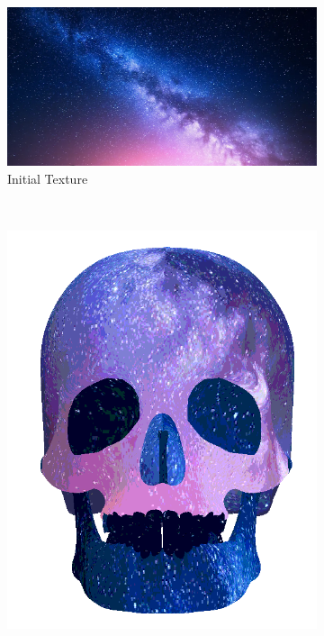 \begin{figure}[h]
    \centering
        \begin{subfigure}[b]{0.3\textwidth}
        \includegraphics[width=\textwidth]{img/textures/space.png}
        \caption{Initial Texture}
        \label{fig:Space}
    \end{subfigure}
    ~
    \centering
    \begin{subfigure}[b]{0.25\textwidth}
        \includegraphics[width=\textwidth]{img/textures/TextureReplacementSkull.png}

\end{subfigure}
\end{figure}
